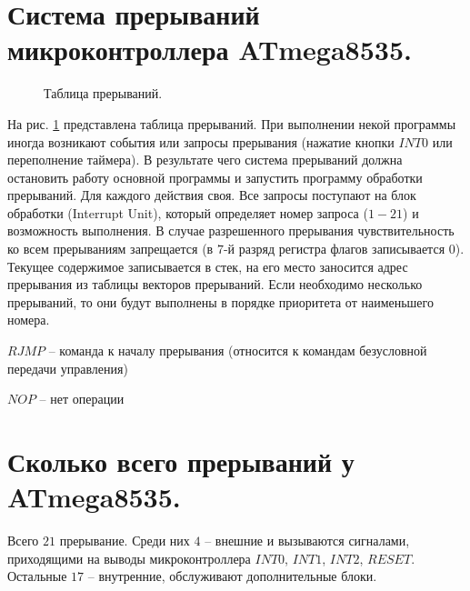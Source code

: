 \section{Система прерываний микроконтроллера ATmega8535.}
\begin{figure}[h!]
  \caption{Таблица прерываний.}
  \label{img::table}
\end{figure}

На рис. \ref{img::table} представлена таблица прерываний. При выполнении некой программы иногда возникают события или запросы прерывания (нажатие кнопки
$INT0$ или переполнение таймера). В результате чего система прерываний должна остановить
работу основной программы и запустить программу обработки прерываний. Для каждого действия 
своя. Все запросы поступают на блок обработки (Interrupt Unit), который определяет номер 
запроса ($1-21$) и возможность выполнения. В случае разрешенного прерывания чувствительность
ко всем прерываниям запрещается (в $7$-й разряд регистра флагов записывается $0$). Текущее 
содержимое записывается в стек, на его место заносится адрес прерывания из таблицы векторов 
прерываний. Если необходимо несколько прерываний, то они будут выполнены в порядке приоритета 
от наименьшего номера.

$RJMP$ -- команда к началу прерывания (относится к командам безусловной передачи управления)

$NOP$ -- нет операции



\section{Сколько всего прерываний у ATmega8535.}
Всего $21$ прерывание. Среди них $4$ -- внешние 
и вызываются сигналами, приходящими на выводы микроконтроллера
$INT0$, $INT1$, $INT2$, $RESET$. Остальные $17$ -- внутренние, обслуживают
дополнительные блоки.


